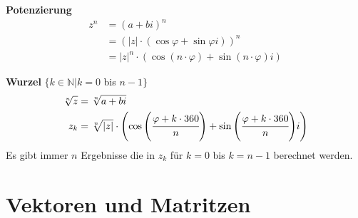 \documentclass[german]{latex4ei/latex4ei_sheet}
\begin{document}
\begin{sectionbox}
\textbf{Potenzierung}
\begin{align*}
{ z }^{ n } &={ \left( a+bi \right)  }^{ n } \\
&={ \left( \left| z \right| \cdot \left( \cos { \varphi  } +\sin { \varphi  } i \right)  \right)  }^{ n } \\
&={ \left| z \right|  }^{ n }\cdot \left( \cos { \left( n\cdot \varphi  \right)  } +\sin { \left( n\cdot \varphi  \right)  } i \right)
\end{align*}

\textbf{Wurzel} $\lbrace k \in \mathbb{N}  \vert k = 0$ bis $n-1 \rbrace$
\begin{align*}
\sqrt[n]{z} &= \sqrt[n]{ a+bi } \\
{ z }_{ k } &= \sqrt[n]{\vert z \vert} \cdot \left( \cos{ \left( \cfrac{ \varphi + k \cdot 360}{n} \right) } +\sin{\left( \cfrac{\varphi + k \cdot 360}{n} \right)} i \right) 
\end{align*}
Es gibt immer $n$ Ergebnisse die in ${ z }_{ k } $ für $k= 0$ bis $k= n-1$ berechnet werden.

\end{sectionbox}

\section{Vektoren und Matritzen}
\end{document}
